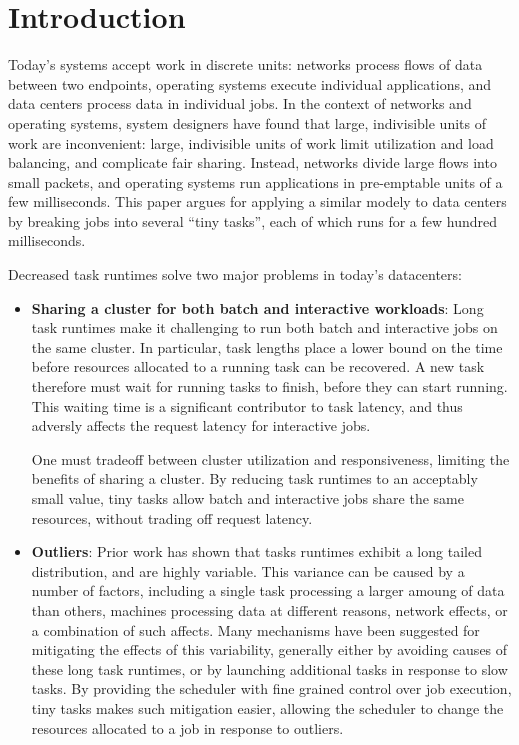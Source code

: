 \section{Introduction}
Today's systems accept work in discrete units: networks process flows of data
between two endpoints, operating systems execute individual applications, and
data centers process data in individual jobs.  In the context of networks and
operating systems, system designers have found that large, indivisible units of work are
inconvenient: large, indivisible units of work limit utilization and load balancing,
and complicate fair sharing.  Instead, networks divide large flows into small
packets, and operating systems run applications in pre-emptable units of a 
few milliseconds.  This paper argues for
applying a similar modely to data centers by breaking jobs into
several ``tiny tasks'', each of which runs for a few hundred milliseconds.

Decreased task runtimes solve two major problems in today's datacenters:
\begin{itemize}
\item \textbf{Sharing a cluster for both batch and interactive workloads}: 
Long task runtimes make it challenging to run both batch and interactive
jobs on the same cluster. In particular, task lengths place a lower bound on
the time before resources allocated to a running task can be recovered. A new
task therefore must wait for running tasks to finish, before they can start running.
This waiting time is a significant contributor to task latency, and thus adversly
affects the request latency for interactive jobs.

One must tradeoff between
cluster utilization and responsiveness, limiting the benefits of sharing
a cluster. By reducing task runtimes to an acceptably small value, tiny
tasks allow batch and interactive jobs share the same resources, without
trading off request latency.

\item \textbf{Outliers}: Prior work has shown that tasks runtimes exhibit a long
tailed distribution, and are highly variable. This variance can be caused by
a number of factors, including a single task processing a larger amoung of data
than others, machines processing data at different reasons, network effects, or
a combination of such affects. Many mechanisms have been suggested for mitigating
the effects of this variability, generally either by avoiding causes of these
long task runtimes, or by launching additional tasks in response to slow tasks.
By providing the scheduler with fine grained control over job execution, tiny
tasks makes such mitigation easier, allowing the scheduler to change the resources
allocated to a job in response to outliers.
\end{itemize}

